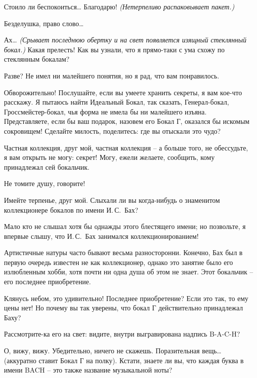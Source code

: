 \documentclass[../main.tex]{subfiles}
\begin{document}
\begin{dialogue}
 {\Large С}тоило ли беспокоиться\ldots{} Благодарю! \emph{(Нетерпеливо распаковывает пакет.)}

 {\Large Б}езделушка, право слово\ldots{}

 Ах\ldots{} \emph{(Срывает последнюю обертку и на свет появляется изящный стеклянный бокал.)} Какая прелесть! Как вы узнали, что я прямо-таки с ума схожу по стеклянным бокалам?

 Разве? Не имел ни малейшего понятия, но я рад, что вам понравилось.

 Обворожительно! Послушайте, если вы умеете хранить секреты, я вам кое-что расскажу. Я пытаюсь найти Идеальный Бокал, так сказать, Генерал-бокал, Гроссмейстер-бокал, чья форма не имела бы ни малейшего изъяна. Представляете, если бы ваш подарок, назовем его Бокал Г, оказался бы искомым сокровищем! Сделайте милость, поделитесь: где вы отыскали это чудо?

 Частная коллекция, друг мой, частная коллекция \--- а больше того, не обессудьте, я вам открыть не могу: секрет! Могу, ежели желаете, сообщить, кому принадлежал сей бокальчик.

 Не томите душу, говорите!

 Имейте терпенье, друг мой. Слыхали ли вы когда-нибудь о знаменитом коллекционере бокалов по имени И.\,С.~Бах?

 Мало кто не слышал хотя бы однажды этого блестящего имени; но позвольте, я впервые слышу, что И.\,С.~Бах занимался коллекционированием!

 {\Large А}ртистичные натуры часто бывают весьма разносторонни. Конечно, Бах был в первую очередь известен не как коллекционер, однако это занятие было его излюбленным хобби, хотя почти ни одна душа об этом не знает. Этот бокальчик \--- его последнее приобретение.

 Клянусь небом, это удивительно! Последнее приобретение? Если это так, то ему цены нет! Но почему вы так уверены, что бокал Г действительно принадлежал Баху?

 Рассмотрите-ка его на свет: видите, внутри выгравирована надпись \mbox{B-A-C-H}?

 О, вижу, вижу. Убедительно, ничего не скажешь. Поразительная вещь\ldots{} (аккуратно ставит Бокал Г на полку). Кстати, знаете ли вы, что каждая буква в имени BACH \--- это также название музыкальной ноты?


\end{dialogue}
\end{document}
